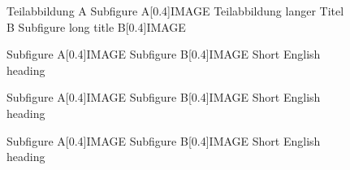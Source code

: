 \documentclass[english,ngerman]{article}
\begin{document}

\begin{figure}[!htb]
  \centering
  \bisubcaptionbox
    {Teilabbildung A\label{fig:test:A}}
    {Subfigure A}[0.4\textwidth]{IMAGE}%
  \qquad
  \bisubcaptionbox
    {Teilabbildung langer Titel B\label{fig:test:B}}
    {Subfigure long title B}[0.4\textwidth]{IMAGE}%
  \label{fig:test}
\end{figure}

\captionsetup{bi-lang=both}

\begin{figure}[!htb]
  \centering
    {Subfigure A}[0.4\textwidth]{IMAGE}%
  \qquad
    {Subfigure B}[0.4\textwidth]{IMAGE}%
    {Short English heading}
\end{figure}

\captionsetup{bi-slc=0}

\begin{figure}[!htb]
  \centering
    {Subfigure A}[0.4\textwidth]{IMAGE}%
  \qquad
    {Subfigure B}[0.4\textwidth]{IMAGE}%
    {Short English heading}
\end{figure}

\captionsetup{slc=0}

\begin{figure}[!htb]
  \centering
    {Subfigure A}[0.4\textwidth]{IMAGE}%
  \qquad
    {Subfigure B}[0.4\textwidth]{IMAGE}%
    {Short English heading}
\end{figure}
\end{document}
